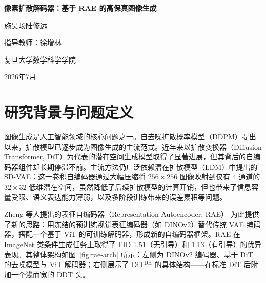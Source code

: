 \documentclass[11pt]{article}
\begin{document}
\begin{center}
{\LARGE \textbf{像素扩散解码器：基于 RAE 的高保真图像生成}}

{\large 施昊旸\quad 陆修远}

{\large 指导教师：徐增林}

{\large 复旦大学数学科学学院}

{\large 2026年7月}
\end{center}

\begin{abstract}
表征自编码器（Representation Autoencoder, RAE）用冻结的视觉表征编码器替代传统 VAE 编码器，在 ImageNet 256$\times$256 类条件生成上取得了很强的结果。然而，RAE 的最终图像仍由一个前馈 ViT 解码器一步得到，细节区域可能出现文字模糊、人脸结构不稳和颜色偏移等问题。本项目尝试用一个在像素空间运行的扩散模型替换这一步解码器，形成“语义潜在空间去噪--像素空间扩散解码”的串行生成框架。我们实现了完整的训练、采样和评估流程，并围绕同步/串行去噪、语义条件注入方式、模型规模、采样 time shift、classifier-free guidance（CFG）和 AutoGuidance 进行了系统实验。最终，最佳模型在 ImageNet 256$\times$256 上达到 FID50k = 2.065，但其参数量和推理开销均显著高于原始 RAE，且仍未超过 RAE 已有结果。我们的结论是：像素扩散解码器作为 RAE 后端在技术上可行，串行解耦和 CFG 设计也确实有效；但在当前条件下，主要瓶颈并不只是解码器容量，而是 DINOv2 语义表征本身缺少足够的像素级信息。该结果为后续研究提供了一个较完整的负面基线，也说明单纯加重像素解码器并不是改进 RAE 细节质量的理想路径。所有代码见\url{https://github.com/shihaoyang0423/Pixel-Generation-with-RAE}。
\end{abstract}

\section{研究背景与问题定义}

图像生成是人工智能领域的核心问题之一。自去噪扩散概率模型（DDPM）\cite{ddpm}提出以来，扩散模型已逐步成为图像生成的主流范式。近年来以扩散变换器（Diffusion Transformer, DiT）\cite{dit}为代表的潜在空间生成模型取得了显著进展，但其背后的自编码器组件却长期停滞不前。主流方法仍广泛依赖潜在扩散模型（LDM）\cite{ldm}中提出的 SD-VAE：这一卷积自编码器通过大幅压缩将 $256\times256$ 图像映射到仅有 4 通道的 $32\times32$ 低维潜在空间，虽然降低了后续扩散模型的计算开销，但也带来了信息容量受限、语义表达能力薄弱，以及多阶段训练带来的误差累积等问题。

Zheng 等人提出的表征自编码器（Representation Autoencoder, RAE）\cite{rae} 为此提供了新的思路：用冻结的预训练视觉表征编码器（如 DINOv2\cite{dinov2}）替代传统 VAE\cite{vae} 编码器，搭配一个基于 ViT\cite{vit} 的可训练解码器，形成新的自编码器框架。RAE 在 ImageNet 类条件生成任务上取得了 FID 1.51（无引导）和 1.13（有引导）的优异表现。其整体架构如图~\ref{fig:rae-arch} 所示：左侧为 DINOv2 编码器、基于 DiT 的去噪模型与 ViT 解码器；右侧展示了 DiT$^{\mathrm{DH}}$ 的具体结构——在标准 DiT 后附加一个浅而宽的 DDT 头。
\end{document}
